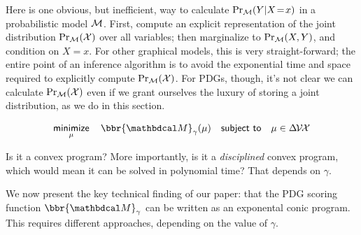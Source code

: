 \documentclass[twoside]{article}
\begin{document}
    
Here is one obvious, but inefficient, way to calculate $\Pr_{\cal M}(Y|X\!=\!x)$ in a 
probabilistic model $\cal M$. First, compute an explicit representation of the joint distribution $\Pr_{\cal M}(\mathcal X)$ over all variables; then marginalize to $\Pr_{\cal M}(X,Y)$, and condition on $X\!=\!x$. 
%
For other graphical models, this is very straight-forward; the entire point of an inference algorithm is to avoid the exponential time and space required to explicitly compute $\Pr_{\cal M}(\mathcal X)$.
For PDGs, though, it's not clear
we can calculate $\Pr_{\cal M}(\mathcal X)$ even if we grant ourselves the luxury of storing a joint distribution, as we do in this section.

\[
    \mathop{\text{\sf minimize}}\limits_\mu\quad
        \bbr{\dg M}_\gamma(\mu)
    \quad \text{\sf subject to}\quad \mu \in \Delta\mskip-2mu\V\mskip-2mu\X
\]

Is it a convex program?
More importantly, is it a \emph{disciplined} convex program, 
    which would mean it can be solved in polynomial time?  
That depends on $\gamma$.

 
We now present the key technical finding of our paper: 
that the PDG scoring function $\bbr{\dg M}_\gamma$ 
can be written as an exponental conic program. 
%
This requires different approaches, depending on the value of $\gamma$.
\end{document}
